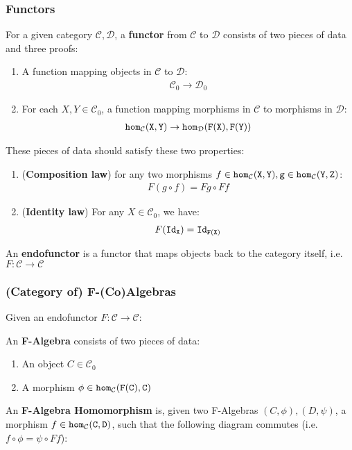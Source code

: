 \subsubsection{Functors}
For a given category $\mathcal{C}, \mathcal{D}$, a \textbf{functor} from $\mathcal{C}$ to $\mathcal{D}$ consists of two pieces of data and three proofs:
\begin{enumerate}
    \item A function mapping objects in $\mathcal{C}$ to $\mathcal{D}$: \begin{align*} \mathcal{C}_0 \to \mathcal{D}_0 \end{align*}
    \item For each $X,Y\in\mathcal{C}_0$, a function mapping morphisms in $\mathcal{C}$ to morphisms in $\mathcal{D}$: \begin{align*} \tt{hom}_\mathcal{C}(X,Y) \to \tt{hom}_\mathcal{D}(F(X),F(Y)) \end{align*}
\end{enumerate}
These pieces of data should satisfy these two properties:
\begin{enumerate}
    \item (\textbf{Composition law}) for any two morphisms $f\in\tt{hom}_\mathcal{C}(X,Y),g\in\tt{hom}_\mathcal{C}(Y,Z)$: \begin{align*} F(g\circ f) = F g \circ F f \end{align*}
    \item (\textbf{Identity law}) For any $X\in\mathcal{C}_0$, we have: \begin{align*} F(\tt{Id}_X) = \tt{Id}_{F(X)} \end{align*}
\end{enumerate}
An \textbf{endofunctor} is a functor that maps objects back to the category itself, i.e. $F:\mathcal{C}\to\mathcal{C}$

\subsubsection{(Category of) F-(Co)Algebras}
Given an endofunctor $F:\mathcal{C}\to\mathcal{C}$:

An \textbf{F-Algebra} consists of two pieces of data:
\begin{enumerate}
    \item An object $C\in \mathcal{C}_0$
    \item A morphism $\phi\in\tt{hom}_\mathcal{C}(F(C),C)$
\end{enumerate}

An \textbf{F-Algebra Homomorphism} is, given two F-Algebras $(C,\phi),(D,\psi)$, a morphism $f\in\tt{hom}_\mathcal{C}(C,D)$, such that the following diagram commutes (i.e. $f\circ\phi=\psi\circ Ff$):
\begin{figure}[H]\vspace{-1em}\hfill
{}\hfill\null
\end{figure}\vspace{-1em}

